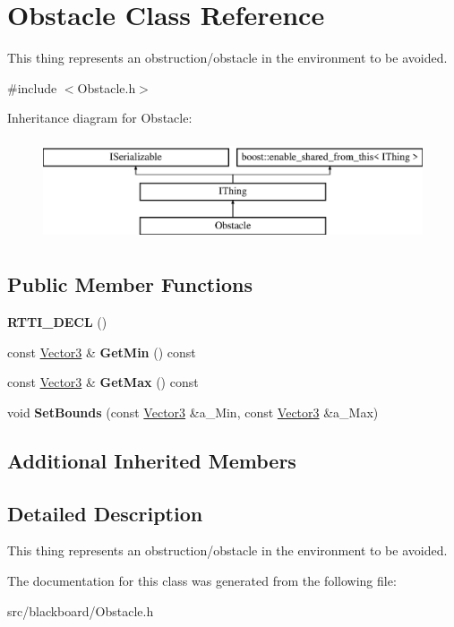 \hypertarget{class_obstacle}{}\section{Obstacle Class Reference}
\label{class_obstacle}


This thing represents an obstruction/obstacle in the environment to be avoided.  




{\ttfamily \#include $<$Obstacle.\+h$>$}

Inheritance diagram for Obstacle\+:\begin{figure}[H]
\begin{center}
\leavevmode
\includegraphics[height=3.000000cm]{class_obstacle}
\end{center}
\end{figure}
\subsection*{Public Member Functions}
\begin{DoxyCompactItemize}
\item 
\mbox{\label{class_obstacle_a63ed2cd3be500b5d813a05d8eed614c0}} 
{\bfseries R\+T\+T\+I\+\_\+\+D\+E\+CL} ()
\item 
\mbox{\label{class_obstacle_a1b2272964ccf5a828b95a6ddda740e03}} 
const \hyperlink{class_vector3}{Vector3} \& {\bfseries Get\+Min} () const
\item 
\mbox{\label{class_obstacle_ab4d20e9f139d97e3e228adcddacf22ba}} 
const \hyperlink{class_vector3}{Vector3} \& {\bfseries Get\+Max} () const
\item 
\mbox{\label{class_obstacle_a3edd540359b9e59e7aa4ca4105361446}} 
void {\bfseries Set\+Bounds} (const \hyperlink{class_vector3}{Vector3} \&a\+\_\+\+Min, const \hyperlink{class_vector3}{Vector3} \&a\+\_\+\+Max)
\end{DoxyCompactItemize}
\subsection*{Additional Inherited Members}


\subsection{Detailed Description}
This thing represents an obstruction/obstacle in the environment to be avoided. 

The documentation for this class was generated from the following file\+:\begin{DoxyCompactItemize}
\item 
src/blackboard/Obstacle.\+h\end{DoxyCompactItemize}
